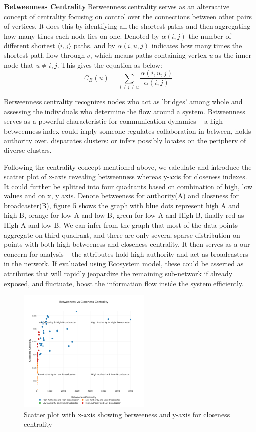 \documentclass[letterpaper, 10 pt, conference]{ieeeconf}  %
\begin{document}
\textbf{Betweenness Centrality}
Betweenness centrality serves as an alternative concept of centrality focusing on control over the connections between other pairs of vertices. It does this by identifying all the shortest paths and then aggregating how many times each node lies on one. Denoted by $\alpha (i, j)$ the number of different shortest $\langle i, j \rangle$ paths, and by $\alpha (i, u, j)$ indicates how many times the shortest path flow through $v$, which means paths containing vertex $u$ as the inner node that $ u \neq i, j$. This gives the equation as below:
\begin{equation}
C_{B}(u) = \sum_{i \neq j \neq u}^{} \frac{\alpha (i, u, j) }{\alpha (i, j)}
\label{C}
\end{equation}

Betweenness centrality recognizes nodes who act as 'bridges' among whole and assessing the individuals who determine the flow around a system. Betweenness serves as a powerful characteristic for communication dynamics -- a high betweenness index could imply someone regulates collaboration in-between, holds authority over, disparates clusters; or infers possibly locates on the periphery of diverse clusters.

Following the centrality concept mentioned above, we calculate and introduce the scatter plot of x-axis revealing betweenness whereas y-axis for closeness indexes.  It could further be splitted into four quadrants based on combination of high, low values and on x, y axis. Denote betweeness for authority(A) and closeness for broadcaster(B), figure 5 shows the graph with blue dots represent high A and high B, orange for low A and low B, green for low A and High B, finally red as High A and low B. We can infer from the graph that most of the data points aggregate on third quadrant, and there are only several sparse distribution on points with both high betweeness and closeness centrality. It then serves as a our concern for analysis -- the attributes hold high authority and act as broadcasters in the network. If evaluated using Ecosystem model, these could be asserted as attributes that will rapidly jeopardize the remaining sub-network if already exposed, and fluctuate, boost the information flow inside the system efficiently.

\begin{figure}[h!]
  \includegraphics[width=\linewidth, height=6cm]{scatterplot.png}
  \caption{Scatter plot with x-axis showing betweeness and y-axis for closeness centrality}
  \label{fig:pic2}
\end{figure}
\end{document}
